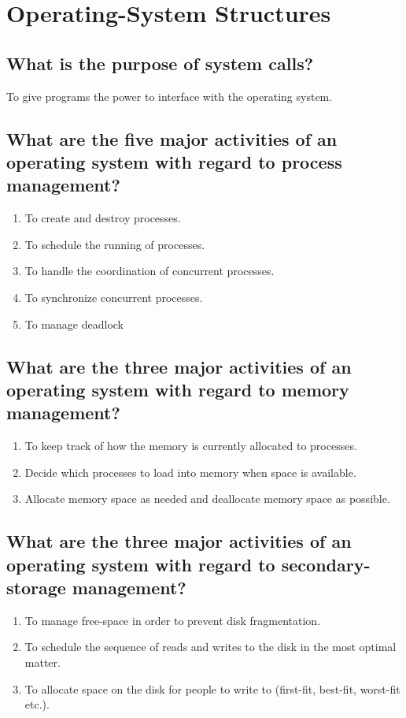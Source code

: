 \documentclass{book}%
\begin{document}
\chapter{Operating-System Structures}
\section{What is the purpose of system calls?}
To give programs the power to interface with the operating system.
\section{What are the five major activities of an operating system with regard to process management?}
\begin{enumerate}
\item To create and destroy processes.
\item To schedule the running of processes. 
\item To handle the coordination of concurrent processes.
\item To synchronize concurrent processes.
\item To manage deadlock %
\end{enumerate}
\section{What are the three major activities of an operating system with regard to memory management?}%
\begin{enumerate}
\item To keep track of how the memory is currently allocated to processes.
\item Decide which processes to load into memory when space is available.
\item Allocate memory space as needed and deallocate memory space as possible.
\end{enumerate}
\section{What are the three major activities of an operating system with regard to secondary-storage management?}%
\begin{enumerate}
\item To manage free-space in order to prevent disk fragmentation.
\item To schedule the sequence of reads and writes to the disk in the most optimal matter.
\item To allocate space on the disk for people to write to (first-fit, best-fit, worst-fit etc.).
\end{enumerate}
\end{document}
